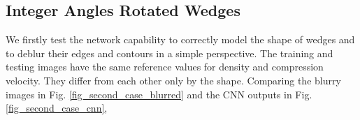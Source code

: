 \documentclass[conference]{IEEEtran}
\begin{document}
\subsection{Integer Angles Rotated Wedges} \label{IARW}
We firstly test the network capability to correctly model the shape of wedges
and to deblur their edges and contours in a simple perspective.
The training and testing images have the same reference values for
density and compression velocity. They differ from each other only by the shape.
Comparing the blurry images in Fig. \ref{fig_second_case_blurred} and the CNN outputs in Fig. \ref{fig_second_case_cnn},
\begin{figure}[!t]
\centering
{}
\end{figure}
\end{document}
